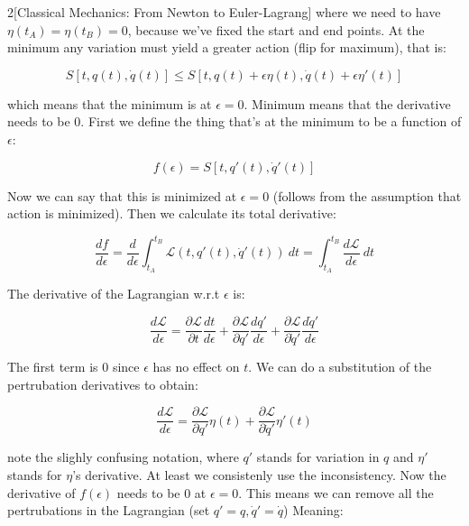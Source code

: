 \documentclass{article}
\begin{document}
\begin{multicols}{2}[Classical Mechanics: From Newton to Euler-Lagrang]
where we need to have $\eta(t_A) = \eta(t_B) = 0$, because we've fixed the start and end points. At the minimum any variation must yield a greater action (flip for maximum), that is:

\begin{equation*}
    S[t, q(t), \dot{q}(t)] \leq S[t, q(t) + \epsilon \eta(t), \dot{q}(t) + \epsilon \eta'(t)]
\end{equation*}

which means that the minimum is at $\epsilon = 0$. Minimum means that the derivative needs to be $0$. First we define the thing that's at the minimum to be a function of $\epsilon$:

\begin{equation*}
    f(\epsilon) = S[t, q'(t), \dot{q}'(t)]
\end{equation*}

Now we can say that this is minimized at $\epsilon = 0$ (follows from the assumption that action is minimized). Then we calculate its total derivative:

\begin{equation}
    \frac{d f}{d \epsilon} = \frac{d}{d \epsilon}\int_{t_A}^{t_B} \mathcal{L}(t, q'(t), \dot{q}'(t))\ dt = \int_{t_A}^{t_B} \frac{d \mathcal{L}}{d \epsilon}\ dt
\end{equation}

The derivative of the Lagrangian w.r.t $\epsilon$ is:

\begin{equation*}
    \frac{d \mathcal{L}}{d \epsilon} = \frac{\partial \mathcal{L}}{\partial t} \frac{d t}{d \epsilon} + \frac{\partial \mathcal{L}}{\partial q'} \frac{dq'}{d \epsilon} + \frac{\partial \mathcal{L}}{\partial \dot{q}'} \frac{d \dot{q}'}{d \epsilon}
\end{equation*}

The first term is $0$ since $\epsilon$ has no effect on $t$. We can do a substitution of the pertrubation derivatives to obtain:

\begin{equation*}
    \frac{d \mathcal{L}}{d \epsilon} = \frac{\partial \mathcal{L}}{\partial q'} \eta(t) + \frac{\partial \mathcal{L}}{\partial \dot{q}'} \eta'(t)
\end{equation*}

note the slighly confusing notation, where $q'$ stands for variation in $q$ and $\eta'$ stands for $\eta$'s derivative. At least we consistenly use the inconsistency. Now the derivative of $f(\epsilon)$ needs to be $0$ at $\epsilon = 0$. This means we can remove all the pertrubations in the Lagrangian (set $q' = q, \dot{q}' = \dot{q}$) Meaning:


\end{multicols}
\end{document}
